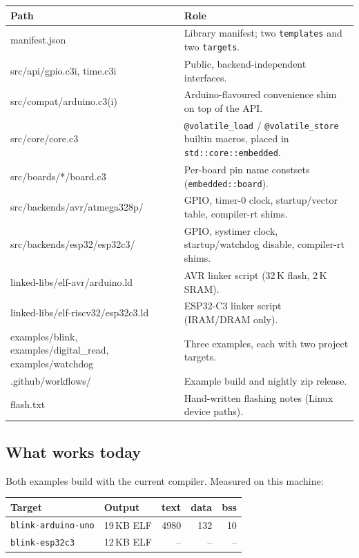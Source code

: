 \documentclass[11pt,a4paper]{article}
\newcommand{\pkg}[1]{\texttt{#1}}
\begin{document}
\begin{longtable}{>{\ttfamily}p{} p{}}
\toprule
\textrm{Path} & Role \\
\midrule
\endhead
manifest.json & Library manifest; two \pkg{templates} and two \pkg{targets}. \\
src/api/gpio.c3i, time.c3i & Public, backend-independent interfaces. \\
src/compat/arduino.c3(i) & Arduino-flavoured convenience shim on top of the API. \\
src/core/core.c3 & \pkg{@volatile\_load} / \pkg{@volatile\_store} builtin macros, placed in \pkg{std::core::embedded}. \\
src/boards/*/board.c3 & Per-board pin name constsets (\pkg{embedded::board}). \\
src/backends/avr/atmega328p/ & GPIO, timer-0 clock, startup/vector table, compiler-rt shims. \\
src/backends/esp32/esp32c3/ & GPIO, systimer clock, startup/watchdog disable, compiler-rt shims. \\
linked-libs/elf-avr/arduino.ld & AVR linker script (32\,K flash, 2\,K SRAM). \\
linked-libs/elf-riscv32/esp32c3.ld & ESP32-C3 linker script (IRAM/DRAM only). \\
examples/blink, examples/digital\_read, examples/watchdog & Three examples, each with two project targets. \\
.github/workflows/ & Example build and nightly zip release. \\
flash.txt & Hand-written flashing notes (Linux device paths). \\
\bottomrule
\end{longtable}

\subsection{What works today}

Both examples build with the current compiler. Measured on this machine:

\begin{center}
\begin{tabular}{llrrr}
\toprule
Target & Output & text & data & bss \\
\midrule
\pkg{blink-arduino-uno} & 19\,KB ELF & 4980 & 132 & 10 \\
\pkg{blink-esp32c3} & 12\,KB ELF & -- & -- & -- \\
\bottomrule
\end{tabular}
\end{center}
\end{document}
